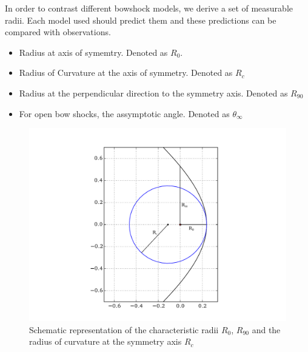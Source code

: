In order to contrast different bowshock models, we  derive a set of measurable radii. Each model used should predict them and these predictions can be
compared with observations.

\begin{itemize}
\item Radius at axis of symemtry. Denoted as $R_0$. 
\item Radius of Curvature at the axis of symmetry. Denoted as $R_c$
\item Radius at the  perpendicular direction to the symmetry axis. Denoted as $R_{90}$
\item For open bow shocks, the assymptotic angle. Denoted as $\theta_\infty$
\end{itemize} 

\begin{figure}
\includegraphics[width=\linewidth]{ch-radii_ed}
\caption{Schematic representation of the characteristic radii $R_0$, $R_{90}$ and the radius of curvature at the symmetry axis $R_c$}
\end{figure}



